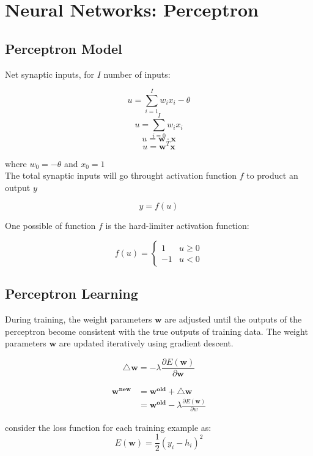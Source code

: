 \chapter{Neural Networks: Perceptron}
\begin{multicols*}{2}

\section{Perceptron Model}

\noindent Net synaptic inputs, for $I$ number of inputs:

$$u = \sum_{i=1}^I w_i x_i - \theta$$
$$u = \sum_{i=0}^I w_i x_i$$
$$u = \mathbf{w} \cdot \mathbf{x}$$
$$u = \mathbf{w}^T \mathbf{x}$$

\noindent where $w_0=-\theta$ and $x_0=1$ \\

\noindent The total synaptic inputs will go throught activation function $f$ to product an output $y$ 

$$y=f(u)$$

\noindent One possible of function $f$ is the hard-limiter activation function:

$$
f(u) = 
\begin{cases}
1 & u \ge 0\\
-1 & u < 0
\end{cases}
$$

\section{Perceptron Learning}

During training, the weight parameters $\mathbf{w}$ are adjusted until the outputs of the perceptron become consistent with the true outputs of training data. The weight parameters $\mathbf{w}$ are updated iteratively using gradient descent. 

$$\mathbf{\triangle w} = - \lambda \frac{\partial E(\mathbf{w})}{\partial \mathbf{w}}$$

\begin{equation*}
\begin{split}
\mathbf{w^{new}} &= \mathbf{w^{old} + \triangle w } \\
&= \mathbf{w^{old}} - \lambda \frac{\partial E(\mathbf{w})}{\partial w}
\end{split}
\end{equation*}

\noindent consider the loss function for each training example as:
$$E(\mathbf{w})=\frac{1}{2}(y_i-h_i)^{2}$$


\end{multicols*}
